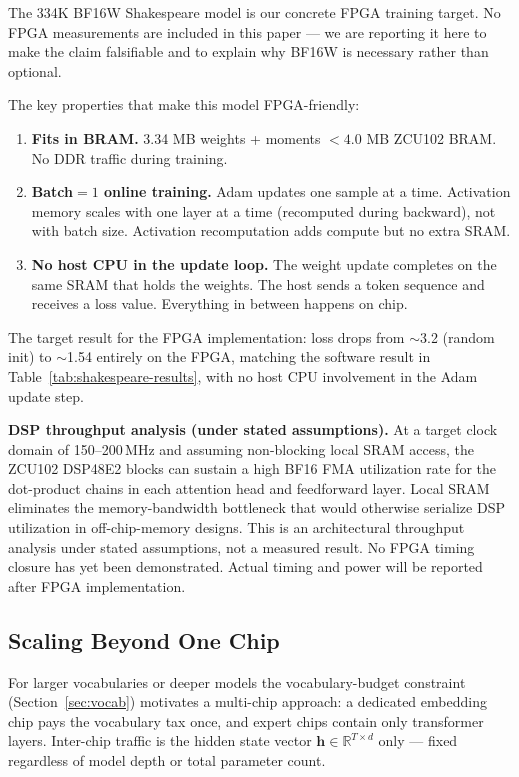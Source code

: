 \documentclass[11pt]{article}
\begin{document}
The 334K BF16W Shakespeare model is our concrete FPGA training target. No FPGA
measurements are included in this paper --- we are reporting it here to make the
claim falsifiable and to explain why BF16W is necessary rather than optional.

The key properties that make this model FPGA-friendly:

\begin{enumerate}
  \item \textbf{Fits in BRAM.} 3.34 MB weights + moments $< 4.0$ MB ZCU102 BRAM.
    No DDR traffic during training.
  \item \textbf{Batch$=1$ online training.} Adam updates one sample at a time.
    Activation memory scales with one layer at a time (recomputed during backward),
    not with batch size. Activation recomputation adds compute but no extra SRAM.
  \item \textbf{No host CPU in the update loop.} The weight update completes on the
    same SRAM that holds the weights. The host sends a token sequence and receives
    a loss value. Everything in between happens on chip.
\end{enumerate}

The target result for the FPGA implementation: loss drops from $\sim$3.2 (random init) to $\sim$1.54
entirely on the FPGA, matching the software result in Table~\ref{tab:shakespeare-results},
with no host CPU involvement in the Adam update step.

\textbf{DSP throughput analysis (under stated assumptions).}
At a target clock domain of 150--200\,MHz and assuming non-blocking local SRAM access,
the ZCU102 DSP48E2 blocks can sustain a high BF16 FMA utilization rate for the
dot-product chains in each attention head and feedforward layer.
Local SRAM eliminates the memory-bandwidth bottleneck that would otherwise serialize
DSP utilization in off-chip-memory designs.
This is an architectural throughput analysis under stated assumptions, not a measured result.
No FPGA timing closure has yet been demonstrated.
Actual timing and power will be reported after FPGA implementation.

\subsection{Scaling Beyond One Chip}

For larger vocabularies or deeper models the vocabulary-budget constraint
(Section~\ref{sec:vocab}) motivates a multi-chip approach: a dedicated embedding chip
pays the vocabulary tax once, and expert chips contain only transformer layers.
Inter-chip traffic is the hidden state vector $\mathbf{h} \in \mathbb{R}^{T \times d}$
only --- fixed regardless of model depth or total parameter count.
\end{document}
